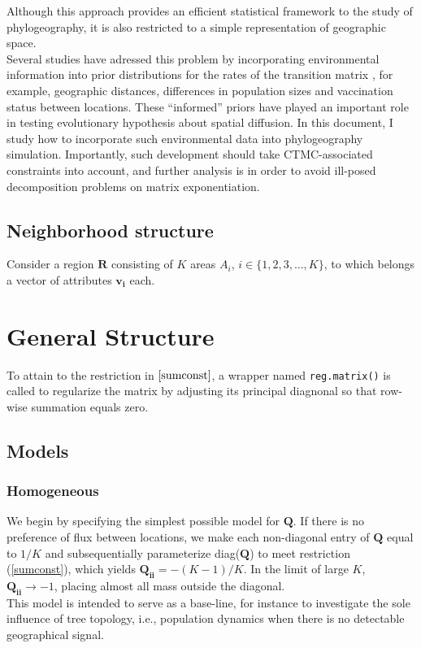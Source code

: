\documentclass[a4paper,10pt]{article}
\begin{document}
\indent Although this approach provides an efficient statistical framework to the study of phylogeography, it is also restricted to a simple representation of geographic space.\\
\indent Several studies have adressed this problem by incorporating environmental information into prior distributions for the rates of the transition matrix \cite{Lemey2009,Faria2012a,Carvalho2012,Nelson2011}, for example, geographic distances, differences in population sizes and vaccination status between locations. These ``informed'' priors have played an important role in testing evolutionary hypothesis about spatial diffusion. In this document, I study how to incorporate such environmental data into phylogeography simulation. Importantly, such development should take CTMC-associated constraints into account, and further analysis is in order to avoid ill-posed decomposition problems on matrix exponentiation.\\
\subsection{Neighborhood structure}
Consider a region $\mathbf{R}$ consisting of $K$ areas $A_i$, $i \in \{1, 2,3,\ldots, K\}$, to which belongs a vector of attributes $\mathbf{v_i}$ each.\\
\section{General Structure}
\indent To attain to the restriction in \(\ref{sumconst}\), a wrapper named \verb|reg.matrix()| is called to regularize the matrix by adjusting its principal diagnonal so that row-wise summation equals zero.\\
\subsection{Models}
\subsubsection{Homogeneous}
\indent We begin by specifying the simplest possible model for $\mathbf{Q}$. If there is no preference of flux between locations, we make each  non-diagonal entry of $\mathbf{Q}$  equal to $1/K$ and subsequentially parameterize diag($\mathbf{Q}$) to meet restriction (\ref{sumconst}), which yields $\mathbf{Q_{ii}} = -(K-1)/K$. In the limit of large $K$, $\mathbf{Q_{ii}} \to -1$, placing almost all mass outside the diagonal.\\
\indent This model is intended to serve as a base-line, for instance to investigate the sole influence of tree topology, i.e., population dynamics when there is no detectable geographical signal.\\
\end{document}
